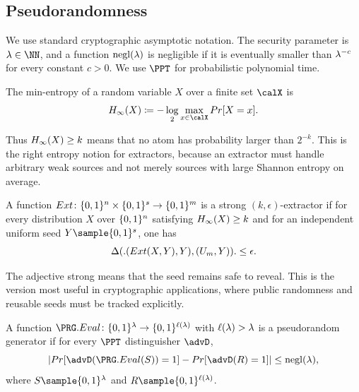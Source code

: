 \subsection{Pseudorandomness}
\label{subsec:pseudorandomness}

We use standard cryptographic asymptotic notation. The security parameter is \(\secparam\in\NN\), and a function \(\operatorname*{negl}(\lambda)\) is negligible if it is eventually smaller than \(\lambda^{-c}\) for every constant \(c>0\). We use \(\PPT\) for probabilistic polynomial time.

\begin{definition}
	\label{def:min-entropy}
	The min-entropy of a random variable \(X\) over a finite set \(\calX\) is
	\begin{equation}
		\MinEntropy(X)\coloneqq -\log_2\max_{x\in\calX}\Prob[X=x].
	\end{equation}
\end{definition}

Thus \(H_\infty(X)\geq k\) means that no atom has probability larger than \(2^{-k}\). This is the right entropy notion for extractors, because an extractor must handle arbitrary weak sources and not merely sources with large Shannon entropy on average.

\begin{definition}
	\label{def:extractor}
	A function \(Ext\colon \{0,1\}^n\times\{0,1\}^s\to\{0,1\}^m\) is a strong \((k,\epsilon)\)-extractor if for every distribution \(X\) over \(\{0,1\}^n\) satisfying \(H_\infty(X)\geq k\) and for an independent uniform seed \(Y\sample\bits^s\), one has
	\begin{equation}
		\StatDist\bigl((\Extractor(X,Y),Y),(\vec{U}_m,Y)\bigr)\leq \epsilon.
	\end{equation}
\end{definition}

The adjective strong means that the seed remains safe to reveal. This is the version most useful in cryptographic applications, where public randomness and reusable seeds must be tracked explicitly.

\begin{definition}
	\label{def:prg}
	A function \(\PRGEval\colon\bits^\secparam\to\bits^{\ell(\secparam)}\) with \(\ell(\lambda)>\lambda\) is a pseudorandom generator if for every \(\PPT\) distinguisher \(\advD\),
	\begin{equation}
		\abs{\Prob[\advD(\PRGEval(S))=1]-\Prob[\advD(R)=1]}\leq \negl(\secparam),
	\end{equation}
	where \(S\sample\bits^\secparam\) and \(R\sample\bits^{\ell(\secparam)}\).
\end{definition}
